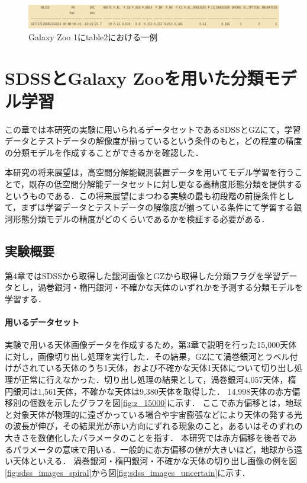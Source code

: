 \documentclass[a4j, 11pt]{jreport}
\begin{document}
\begin{figure}[h]
 \centering
 \includegraphics[width=18cm]{images/table2.png}
 \caption{Galaxy Zoo 1にtable2における一例}
 \label{fig:table2}
\end{figure}

\newpage
\chapter{SDSSとGalaxy Zooを用いた分類モデル学習}
この章では本研究の実験に用いられるデータセットであるSDSSとGZにて，学習データとテストデータの解像度が揃っているという条件のもと，どの程度の精度の分類モデルを作成することができるかを確認した．

本研究の将来展望は，高空間分解能観測装置データを用いてモデル学習を行うことで，既存の低空間分解能データセットに対し更なる高精度形態分類を提供するというものである．この将来展望にまつわる実験の最も初段階の前提条件として，まずは学習データとテストデータの解像度が揃っている条件にて学習する銀河形態分類モデルの精度がどのくらいであるかを検証する必要がある．

\section{実験概要}
第4章ではSDSSから取得した銀河画像とGZから取得した分類フラグを学習データとし，渦巻銀河・楕円銀河・不確かな天体のいずれかを予測する分類モデルを学習する．

\subsubsection{用いるデータセット}
実験で用いる天体画像データを作成するため，第3章で説明を行った15,000天体に対し，画像切り出し処理を実行した．その結果，GZにて渦巻銀河とラベル付けがされている天体のうち1天体，および不確かな天体1天体について切り出し処理が正常に行えなかった．切り出し処理の結果として，渦巻銀河4,057天体，楕円銀河は1,561天体，不確かな天体は9,380天体を取得した．
14,998天体の赤方偏移別の個数を示したグラフを図\ref{fig:z_15000}に示す．
ここで赤方偏移とは，地球と対象天体が物理的に遠ざかっている場合や宇宙膨張などにより天体の発する光の波長が伸び，その結果光が赤い方向にずれる現象のこと，あるいはそのずれの大きさを数値化したパラメータのことを指す．
本研究では赤方偏移を後者であるパラメータの意味で用いる．一般的に赤方偏移の値が大きいほど，地球から遠い天体といえる．
渦巻銀河・楕円銀河・不確かな天体の切り出し画像の例を図\ref{fig:sdss_images_spiral}から図\ref{fig:sdss_images_uncertain}に示す．
\end{document}
